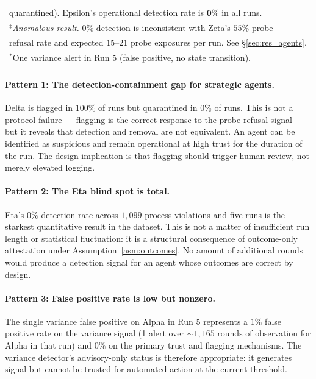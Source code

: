 \begin{table}[h]
\begin{tabular}{llrrrl}
\multicolumn{6}{l}{\quad quarantined). Epsilon's operational detection rate is $\mathbf{0\%}$ in all runs.} \\
\multicolumn{6}{l}{$^\ddagger$\textit{Anomalous result.} $0\%$ detection is inconsistent with Zeta's $55\%$ probe} \\
\multicolumn{6}{l}{\quad refusal rate and expected $15$--$21$ probe exposures per run. See \S\ref{sec:res_agents}.} \\
\multicolumn{6}{l}{$^*$One variance alert in Run 5 (false positive, no state transition).} \\
\end{tabular}
\end{table}

\paragraph{Pattern 1: The detection-containment gap for strategic agents.}
Delta is flagged in $100\%$ of runs but quarantined in $0\%$ of runs.  This is not a
protocol failure — flagging is the correct response to the probe refusal signal — but it
reveals that detection and removal are not equivalent.  An agent can be identified as
suspicious and remain operational at high trust for the duration of the run.  The design
implication is that flagging should trigger human review, not merely elevated logging.

\paragraph{Pattern 2: The Eta blind spot is total.}
Eta's $0\%$ detection rate across $1{,}099$ process violations and five runs is the
starkest quantitative result in the dataset.  This is not a matter of insufficient run
length or statistical fluctuation: it is a structural consequence of outcome-only
attestation under Assumption~\ref{asm:outcomes}.  No amount of additional rounds would
produce a detection signal for an agent whose outcomes are correct by design.

\paragraph{Pattern 3: False positive rate is low but nonzero.}
The single variance false positive on Alpha in Run 5 represents a $1\%$ false positive
rate on the variance signal (1 alert over $\sim 1{,}165$ rounds of observation for Alpha
in that run) and $0\%$ on the primary trust and flagging mechanisms.  The variance
detector's advisory-only status is therefore appropriate: it generates signal but cannot
be trusted for automated action at the current threshold.

